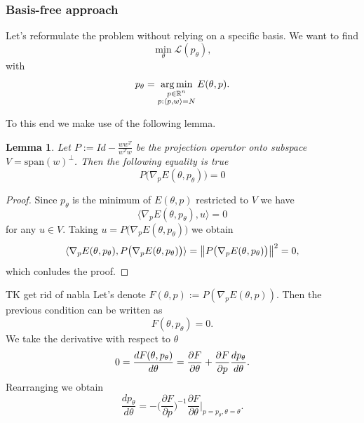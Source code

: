 \documentclass[a4paper,10pt]{report}
\newtheorem{lemma}{Lemma}
\begin{document}



\subsubsection{Basis-free approach}
Let's reformulate the problem without relying on a specific basis.
We want to find
\begin{equation}
 \min_\theta \mathcal{L}(p_\theta),
\end{equation}
with
\begin{equation}
p_\theta = \operatorname*{arg\,min}_{\substack{p \in \mathbb{R}^n \\ p: \langle p, w \rangle=N }} E(\theta, p).
\end{equation}


 To this end we make use of the following lemma.

\begin{lemma}
 Let $P := Id -\frac{ww^T}{w^Tw} $ be the projection operator onto subspace $V = \text{span}(w)^{\perp}$. Then the following equality is true
 \begin{equation}
  P\big(\nabla_p E(\theta, p_\theta)\big) = 0
 \end{equation}

\end{lemma}

\begin{proof}
  Since $p_\theta$ is the minimum of $E(\theta,p)$ restricted to $V$ we have \[\langle \nabla_p E(\theta,p_{\theta}), u \rangle = 0\] for any $u\in V$. Taking $u = P\big( \nabla_p E(\theta,p_\theta)\big)$ we obtain
  \[\langle \nabla_p E(\theta,p_{\theta}), P\big( \nabla_p E(\theta,p_\theta)\big) \rangle = \left\|P\big( \nabla_p E(\theta,p_\theta)\big)\right\|^2=0,\]
  which conludes the proof.
\end{proof}
TK get rid of nabla
Let's denote $F(\theta,p) :=P (\nabla_p E(\theta,p)).$ Then the previous condition can be written as
\begin{equation}
 F(\theta,p_\theta) = 0.
\end{equation}
We take the derivative with respect to $\theta$
\begin{equation}
0=\frac{dF(\theta, p_\theta)}{d \theta} = \frac{\partial F}{\partial \theta} + \frac{\partial F}{\partial p} \frac{dp_\theta}{d \theta}.
\end{equation}
Rearranging we obtain
\begin{equation}
 \frac{d p_\theta}{d\theta} = - \bigg(\frac{\partial F}{\partial p}\bigg)^{-1}  \frac{\partial F}{\partial \theta}\bigg|_{p=p_\theta, \theta=\theta}.
\end{equation}
\end{document}
